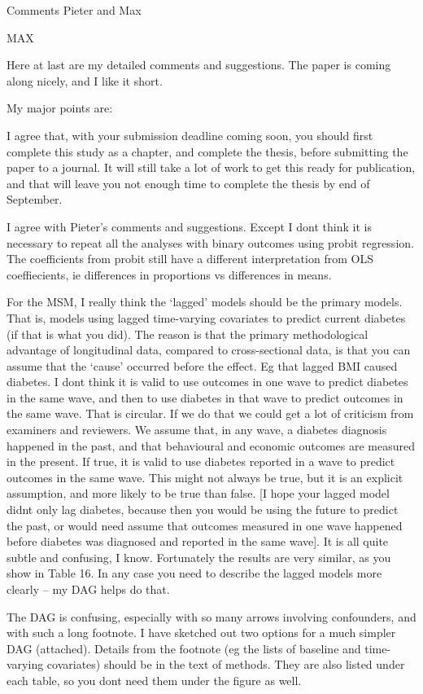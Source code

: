 Comments Pieter and Max

MAX

Here at last are my detailed comments and suggestions. The paper is coming along nicely, and I like it short.
 
My major points are:
 
I agree that, with your submission deadline coming soon, you should first complete this study as a chapter, and complete the thesis, before submitting the paper to a journal. It will still take a lot of work to get this ready for publication, and that will leave you not enough time to complete the thesis by end of September.
 
I agree with Pieter’s comments and suggestions. Except I dont think it is necessary to repeat all the analyses with binary outcomes using probit regression. The coefficients from probit still have a different interpretation from OLS coeffiecients, ie differences in proportions vs differences in means.
 
For the MSM, I really think the ‘lagged’ models should be the primary models. That is, models using lagged time-varying covariates to predict current diabetes (if that is what you did). The reason is that the primary methodological advantage of longitudinal data, compared to cross-sectional data, is that you can assume that the ‘cause’ occurred before the effect. Eg that lagged BMI caused diabetes. I dont think it is valid to use outcomes in one wave to predict diabetes in the same wave, and then to use diabetes in that wave to predict outcomes in the same wave. That is circular. If we do that we could get a lot of criticism from examiners and reviewers. We assume that, in any wave, a diabetes diagnosis happened in the past, and that behavioural and economic outcomes are measured in the present. If true, it is valid to use diabetes reported in a wave to predict outcomes in the same wave. This might not always be true, but it is an explicit assumption, and more likely to be true than false. [I hope your lagged model didnt only lag diabetes, because then you would be using the future to predict the past, or would need assume that outcomes measured in one wave happened before diabetes was diagnosed and reported in the same wave]. It is all quite subtle and confusing, I know.  Fortunately the results are very similar, as you show in Table 16. In any case you need to describe the lagged models more clearly – my DAG helps do that.
 
The DAG is confusing, especially with so many arrows involving confounders, and with such a long footnote. I have sketched out two options for a much simpler DAG (attached). Details from the footnote (eg the lists of baseline and time-varying covariates) should be in the text of methods. They are also listed under each table, so you dont need them under the figure as well.
 
